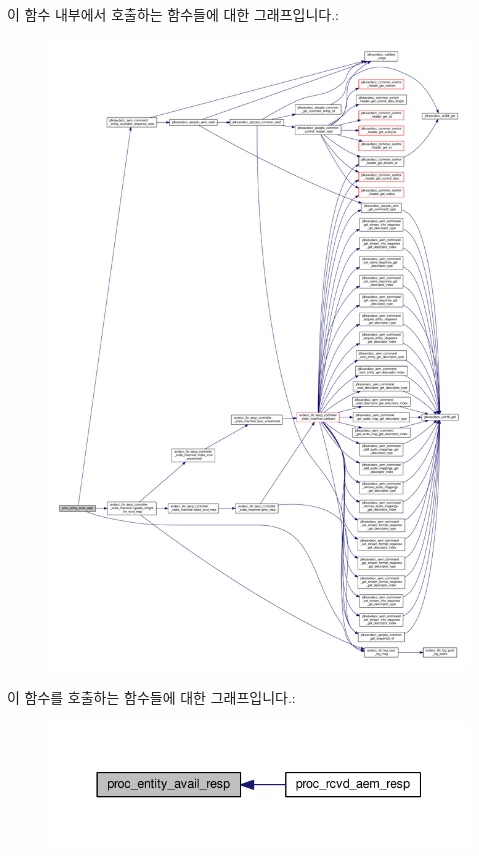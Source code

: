 이 함수 내부에서 호출하는 함수들에 대한 그래프입니다.\+:
\nopagebreak
\begin{figure}[H]
\begin{center}
\leavevmode
\includegraphics[width=350pt]{classavdecc__lib_1_1end__station__imp_aac9243417afd8dbcfb91d061128d5aec_cgraph}
\end{center}
\end{figure}




이 함수를 호출하는 함수들에 대한 그래프입니다.\+:
\nopagebreak
\begin{figure}[H]
\begin{center}
\leavevmode
\includegraphics[width=337pt]{classavdecc__lib_1_1end__station__imp_aac9243417afd8dbcfb91d061128d5aec_icgraph}
\end{center}
\end{figure}


